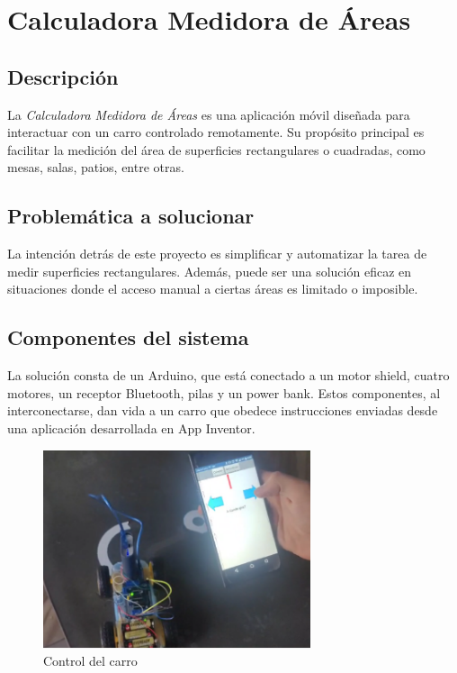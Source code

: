 \section{Calculadora Medidora de Áreas}

\subsection{Descripción}
La \textit{Calculadora Medidora de Áreas} es una aplicación móvil diseñada para interactuar con un carro controlado remotamente. Su propósito principal es facilitar la medición del área de superficies rectangulares o cuadradas, como mesas, salas, patios, entre otras.

\subsection{Problemática a solucionar}
La intención detrás de este proyecto es simplificar y automatizar la tarea de medir superficies rectangulares. Además, puede ser una solución eficaz en situaciones donde el acceso manual a ciertas áreas es limitado o imposible.

\subsection{Componentes del sistema}
La solución consta de un Arduino, que está conectado a un motor shield, cuatro motores, un receptor Bluetooth, pilas y un power bank. Estos componentes, al interconectarse, dan vida a un carro que obedece instrucciones enviadas desde una aplicación desarrollada en App Inventor.

\begin{figure}[H]
    \centering
    \includegraphics[width=0.7\textwidth]{Figures/0. General/car_controller.png}
    \caption{Control del carro}
    \label{Control del carro}
\end{figure}

